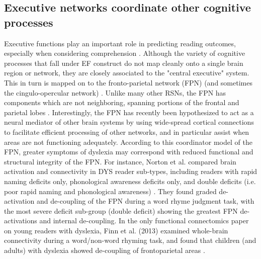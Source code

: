 \subsection{Executive networks coordinate other cognitive processes} 
Executive functions play an important role in predicting reading outcomes, especially when considering comprehension \citep{Cutting2008}. Although the variety of cognitive processes that fall under EF construct do not map cleanly onto a single brain region or network, they are closely associated to the "central executive" system. This in turn is mapped on to the fronto-parietal network (FPN) (and sometimes the cingulo-opercular network) \citep{Fedorenko2013, Cocchi2013}. Unlike many other RSNs, the FPN has components which are not neighboring, spanning portions of the frontal and parietal lobes \citep{Yeo2011}. Interestingly, the FPN has recently been hypothesized to act as a neural mediator of other brain systems \citep{Mennon2010, Cole2014} by using wide-spread cortical connections to facilitate efficient processing of other networks, and in particular assist when areas are not functioning adequately. According to this coordinator model of the FPN, greater symptoms of dyslexia may correspond with reduced functional and structural integrity of the FPN. For instance, Norton et al. compared brain activation and connectivity in DYS reader sub-types, including readers with rapid naming deficits only, phonological awareness deficits only, and double deficits (i.e. poor rapid naming and phonological awareness) \citep{Norton2014}. They found graded de-activation and de-coupling of the FPN during a word rhyme judgment task, with the most severe deficit sub-group (double deficit) showing the greatest FPN de-activations and internal de-coupling. In the only functional connectomics paper on young readers with dyslexia, Finn et al. (2013) examined whole-brain connectivity during a word/non-word rhyming task, and found that children (and adults) with dyslexia showed de-coupling of frontoparietal areas \citep{Finn2013}. 

